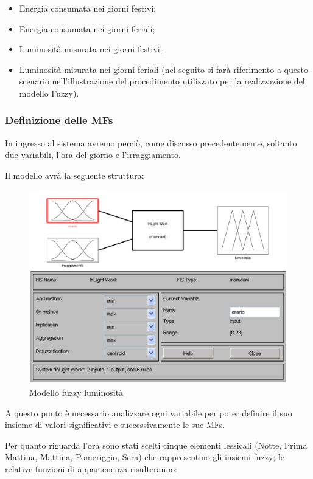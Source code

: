 \begin{itemize}
  \item Energia consumata nei giorni festivi;
  \item Energia consumata nei giorni feriali;
  \item Luminosità misurata nei giorni festivi;
  \item Luminosità misurata nei giorni feriali (nel seguito si farà riferimento a questo scenario nell'illustrazione del procedimento utilizzato per la realizzazione del modello Fuzzy).
\end{itemize}


\subsubsection{Definizione delle MFs}
In ingresso al sistema avremo perciò, come discusso precedentemente, soltanto due variabili, l'ora del giorno e l'irraggiamento.

Il modello avrà la seguente struttura:

\begin{figure}
  \centering
  \includegraphics[scale=0.5]{images/fuzzy/modello_fuzzy_luminosita.pdf}
  \caption{Modello fuzzy luminosità}
\end{figure}

A questo punto è necessario analizzare ogni variabile per poter definire il suo insieme di valori significativi e successivamente le sue MFs.

Per quanto riguarda l'ora sono stati scelti cinque elementi lessicali (Notte, Prima Mattina, Mattina, Pomeriggio, Sera) che rappresentino gli insiemi fuzzy; le relative funzioni di appartenenza risulteranno:

